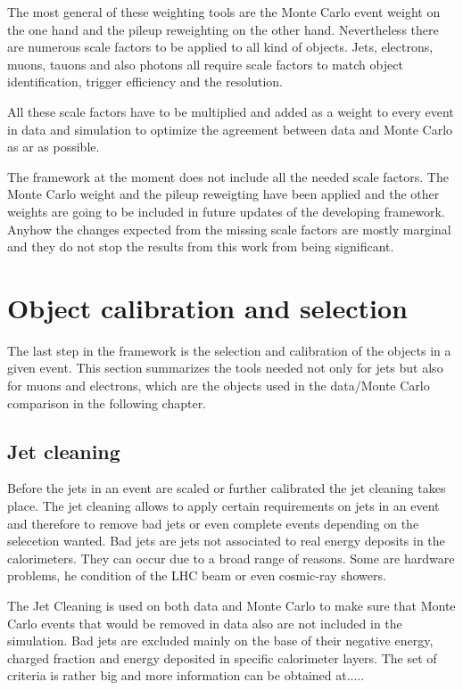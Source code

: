 The most general of these weighting tools are the Monte Carlo event weight on the one hand and the pileup reweighting on the other hand. Nevertheless there are numerous scale factors to be applied to all kind of objects. Jets, electrons, muons, tauons and also photons all require scale factors to match object identification, trigger efficiency and the resolution. 

All these scale factors have to be multiplied and added as a weight to every event in data and simulation to optimize the agreement between data and Monte Carlo as ar as possible.

The framework at the moment does not include all the needed scale factors. The Monte Carlo weight and the pileup reweigting have been applied and the other weights are going to be included in future updates of the developing framework. Anyhow the changes expected from the missing scale factors are mostly marginal and they do not stop the results from this work from being significant.

\section{Object calibration and selection}

The last step in the framework is the selection and calibration of the objects in a given event. This section summarizes the tools needed not only for jets but also for muons and electrons, which are the objects used in the data/Monte Carlo comparison in the following chapter.

\subsection{Jet cleaning}

Before the jets in an event are scaled or further calibrated the jet cleaning takes place. The jet cleaning allows to apply certain requirements on jets in an event and therefore to remove bad jets or even complete events depending on the selecetion wanted. Bad jets are jets not associated to real energy deposits in the calorimeters. They can occur due to a broad range of reasons. Some are hardware problems, he condition of the LHC beam or even cosmic-ray showers.

The Jet Cleaning is used on both data and Monte Carlo to make sure that Monte Carlo events that would be removed in data also are not included in the simulation.
Bad jets are excluded mainly on the base of their negative energy, charged fraction and energy deposited in specific calorimeter layers. The set of criteria is rather big and more information can be obtained at.....

